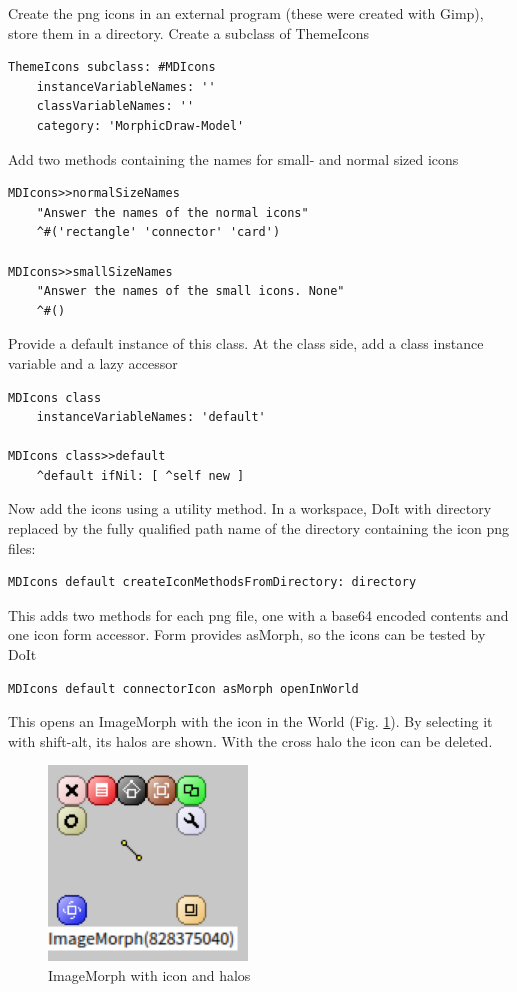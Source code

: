 \documentclass[10pt, twoside]{article}   	%
\begin{document}
Create the png icons in an external program
(these were created with Gimp), store them in a directory.
Create a subclass of ThemeIcons
\begin{verbatim}
ThemeIcons subclass: #MDIcons
    instanceVariableNames: ''
    classVariableNames: ''
    category: 'MorphicDraw-Model'
\end{verbatim}
Add two methods containing the names for small- and normal sized icons
\begin{verbatim}
MDIcons>>normalSizeNames
    "Answer the names of the normal icons"
    ^#('rectangle' 'connector' 'card')

MDIcons>>smallSizeNames
    "Answer the names of the small icons. None"
    ^#()
\end{verbatim}
Provide a default instance of this class. At the class side, add 
a class instance variable and a lazy accessor
\begin{verbatim}
MDIcons class
    instanceVariableNames: 'default'

MDIcons class>>default
    ^default ifNil: [ ^self new ]
\end{verbatim}
Now add the icons using a utility method. In a workspace, DoIt
with directory replaced by the fully qualified path name of the
directory containing the icon png files:
\begin{verbatim}
MDIcons default createIconMethodsFromDirectory: directory 
\end{verbatim}
This adds two methods for each png file, one with a base64 encoded
contents and one icon form accessor. Form provides asMorph,
so the icons can be tested by DoIt
\begin{verbatim}
MDIcons default connectorIcon asMorph openInWorld
\end{verbatim}
This opens an ImageMorph with the icon in the World (Fig. \ref{iconhalos}). 
By selecting it with shift-alt, its halos are shown. With the cross halo the icon can be deleted. 
\begin{figure}[htb]
\begin{center}
\includegraphics[width=150pt]{ImageIcon.png}
\caption{ImageMorph with icon and halos}
\label{iconhalos}
\end{center}
\end{figure}
\end{document}

